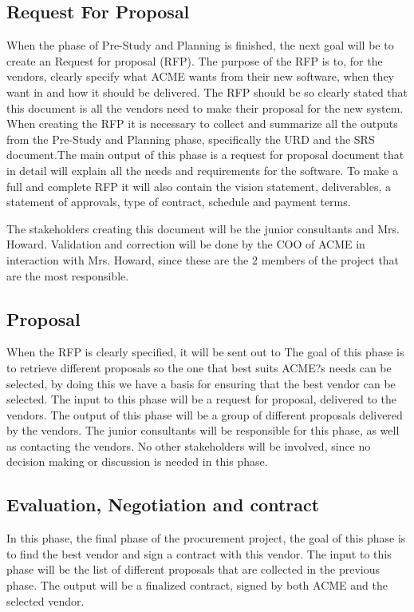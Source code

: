 \documentclass[a4paper]{article}
\begin{document}
\subsection{Request For Proposal}
\label{sub:request_for_propsal}
When the phase of Pre-Study and Planning is finished, the next goal will be to create an Request for proposal (RFP). The purpose of the RFP is to, for the vendors, clearly specify what ACME wants from their new software, when they want in and how it should be delivered\cite{SPM34}. The RFP should be so clearly stated that this document is all the vendors need to make their proposal for the new system. 
When creating the RFP it is necessary to collect and summarize all the outputs from the Pre-Study and Planning phase, specifically the URD and the SRS document.The main output of this phase is a request for proposal document that in detail will explain all the needs and requirements for the software. To make a full and complete RFP it will also contain the vision statement, deliverables, a statement of approvals, type of contract, schedule and payment terms\cite{SPM3536}.

The stakeholders creating this document will be the junior consultants and Mrs. Howard. Validation and correction will be done by the COO of ACME in interaction with Mrs. Howard, since these are the 2 members of the project that are the most responsible.

\subsection{Proposal}
\label{sub:proposal}
When the RFP is clearly specified, it will be sent out to 
The goal of this phase is to retrieve different proposals so the one that best suits ACME?s needs can be selected, by doing this we have a basis for ensuring that the best vendor can be selected. The input to this phase will be a request for proposal, delivered to the vendors. The output of this phase will be a group of different proposals delivered by the vendors. The junior consultants will be responsible for this phase, as well as contacting the vendors. No other stakeholders will be involved, since no decision making or discussion is needed in this phase.

\subsection{Evaluation, Negotiation and contract}
\label{sub:evaluation_negotiation_and_contract}
In this phase, the final phase of the procurement project, the goal of this phase is to find the best vendor and sign a contract with this vendor. The input to this phase will be the list of different proposals that are collected in the previous phase. The output will be a finalized contract, signed by both ACME and the selected vendor. 
\end{document}
